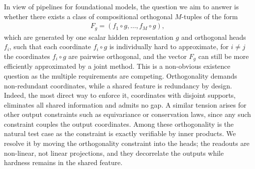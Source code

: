 \documentclass[twoside,11pt]{article}
\begin{document}
In view of pipelines for foundational models, the question we aim to answer is whether there exists a class of compositional orthogonal $M$-tuples of the form
\begin{align}
F_g = (f_1 \circ g, \ldots, f_M \circ g),
\end{align}
which are generated by one scalar hidden representation $g$ and orthogonal heads $f_i$,
such that each coordinate $f_i \circ g$ is individually hard to approximate,
for $i\neq j$ the coordinates $f_i \circ g$ are pairwise orthogonal,
and the vector $F_g$ can still be more efficiently approximated by a joint method.
This is a non-obvious existence question as the multiple requirements are competing. Orthogonality demands non-redundant coordinates, while a shared feature is redundancy by design. Indeed, the most direct way to enforce it, coordinates with disjoint supports, eliminates all shared information and admits no gap.
A similar tension arises for other output constraints such as equivariance or conservation laws, since any such constraint couples the output coordinates.
Among these orthogonality is the natural test case as the constraint is exactly verifiable by inner products.
We resolve it by moving the orthogonality constraint into the heads; the readouts are non-linear, not linear projections, and they decorrelate the outputs while hardness remains in the shared feature. 
\end{document}
